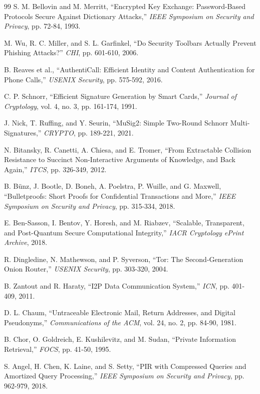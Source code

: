\documentclass[11pt,twocolumn]{article}
\begin{document}
\begin{thebibliography}{99}
S. M. Bellovin and M. Merritt, ``Encrypted Key Exchange: Password-Based Protocols Secure Against Dictionary Attacks,'' \textit{IEEE Symposium on Security and Privacy}, pp. 72-84, 1993.

M. Wu, R. C. Miller, and S. L. Garfinkel, ``Do Security Toolbars Actually Prevent Phishing Attacks?'' \textit{CHI}, pp. 601-610, 2006.

B. Reaves et al., ``AuthentiCall: Efficient Identity and Content Authentication for Phone Calls,'' \textit{USENIX Security}, pp. 575-592, 2016.

C. P. Schnorr, ``Efficient Signature Generation by Smart Cards,'' \textit{Journal of Cryptology}, vol. 4, no. 3, pp. 161-174, 1991.

J. Nick, T. Ruffing, and Y. Seurin, ``MuSig2: Simple Two-Round Schnorr Multi-Signatures,'' \textit{CRYPTO}, pp. 189-221, 2021.

N. Bitansky, R. Canetti, A. Chiesa, and E. Tromer, ``From Extractable Collision Resistance to Succinct Non-Interactive Arguments of Knowledge, and Back Again,'' \textit{ITCS}, pp. 326-349, 2012.

B. Bünz, J. Bootle, D. Boneh, A. Poelstra, P. Wuille, and G. Maxwell, ``Bulletproofs: Short Proofs for Confidential Transactions and More,'' \textit{IEEE Symposium on Security and Privacy}, pp. 315-334, 2018.

E. Ben-Sasson, I. Bentov, Y. Horesh, and M. Riabzev, ``Scalable, Transparent, and Post-Quantum Secure Computational Integrity,'' \textit{IACR Cryptology ePrint Archive}, 2018.

R. Dingledine, N. Mathewson, and P. Syverson, ``Tor: The Second-Generation Onion Router,'' \textit{USENIX Security}, pp. 303-320, 2004.

B. Zantout and R. Haraty, ``I2P Data Communication System,'' \textit{ICN}, pp. 401-409, 2011.

D. L. Chaum, ``Untraceable Electronic Mail, Return Addresses, and Digital Pseudonyms,'' \textit{Communications of the ACM}, vol. 24, no. 2, pp. 84-90, 1981.

B. Chor, O. Goldreich, E. Kushilevitz, and M. Sudan, ``Private Information Retrieval,'' \textit{FOCS}, pp. 41-50, 1995.

S. Angel, H. Chen, K. Laine, and S. Setty, ``PIR with Compressed Queries and Amortized Query Processing,'' \textit{IEEE Symposium on Security and Privacy}, pp. 962-979, 2018.


\end{thebibliography}
\end{document}
